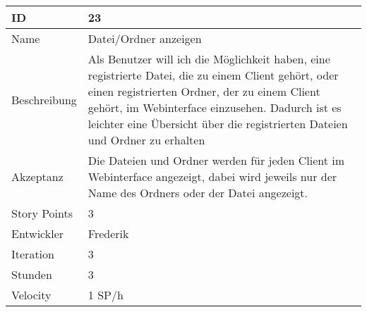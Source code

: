 \begin{table}[htbp]
    \begin{minipage}{\linewidth}
        \setlength{\tymax}{0.5\linewidth}
        \centering
        \small
        \begin{tabulary}{\textwidth}{|l|p{10cm}|} \hline
            ID   &23\\\hline
	    Name  &Datei/Ordner anzeigen\\\hline
	    Beschreibung&Als Benutzer will ich die Möglichkeit haben, eine registrierte Datei, die zu einem Client gehört, oder einen registrierten Ordner, der zu einem Client gehört, im Webinterface einzusehen. Dadurch ist es leichter eine Übersicht über die registrierten Dateien und Ordner zu erhalten\\\hline
	    Akzeptanz &Die Dateien und Ordner werden für jeden Client im Webinterface angezeigt, dabei wird jeweils nur der Name des Ordners oder der Datei angezeigt.\\\hline
            Story Points&3\\\hline
            Entwickler &Frederik\\\hline
            Iteration &3\\\hline
            Stunden  &3\\\hline
            Velocity &1 SP\slash h\\\hline
        \end{tabulary}
    \end{minipage}
\end{table}



